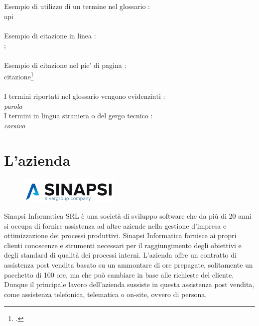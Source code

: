 \noindent Esempio di utilizzo di un termine nel glossario :\\\gls{api}\\ \\
\noindent Esempio di citazione in linea :\\\cite{site:agile-manifesto};\\\\
\noindent Esempio di citazione nel pie' di pagina :\\citazione\footcite{womak:lean-thinking} \\\\
\noindent I termini riportati nel glossario vengono evidenziati :\\\emph{parola}\glsfirstoccur\\ \noindent I termini in lingua straniera o del gergo tecnico :\\ \emph{corsivo}\\




\section{L'azienda}
\begin{figure}[!h] 
	\centering 
	\includegraphics{immagini/logo_sinapsi.jpg} 
\end{figure}
Sinapsi Informatica SRL è una società di sviluppo software che da più di 20 anni si occupa di fornire assistenza ad altre aziende nella gestione d'impresa e ottimizzazione dei processi produttivi.
Sinapsi Informatica fornisce ai propri clienti conoscenze e strumenti necessari per il raggiungimento degli obiettivi e degli standard di qualità dei processi interni.
L'azienda offre un contratto di assistenza post vendita basato su un ammontare di ore prepagate, solitamente un pacchetto di 100 ore, ma che può cambiare in base alle richieste del cliente.
Dunque il principale lavoro dell'azienda sussiste in questa assistenza post vendita, come assistenza telefonica, telematica o on-site, ovvero di persona.
